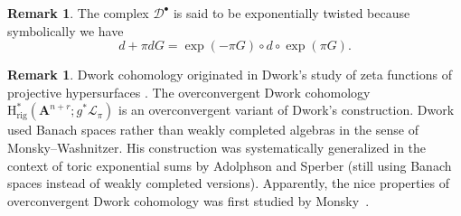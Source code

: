 \documentclass{amsart}
\numberwithin{equation}{section}
\theoremstyle{plain}
\theoremstyle{definition}
\newtheorem{remark}[equation]{Remark}
\renewcommand{\mathbb}{\mathbf}
\begin{document}
\begin{remark}%
The complex \(\mathcal{D}^{\bullet}\) is said to be exponentially
twisted because symbolically we have
\[
d + \pi dG = \exp(-\pi G) \circ d \circ \exp(\pi G).
\]
\end{remark}

\begin{remark}%
\label{remark:exponential-twist}
Dwork cohomology originated in Dwork's study of zeta functions of
projective hypersurfaces
\cite{dwork:zeta-function-hypersurface-1,dwork:zeta-function-hypersurface-2}.
The overconvergent Dwork cohomology
\(\mathrm{H}^{\ast}_{\mathrm{rig}}(\mathbb{A}^{n+r};g^{\ast}\mathcal{L}_{\pi})\)
is an overconvergent variant of Dwork's construction.  Dwork used
Banach spaces rather than weakly completed algebras in the sense of
Monsky--Washnitzer.  His construction was systematically generalized
in the context of toric exponential sums by Adolphson and Sperber
\cite{adolphson-sperber:exponential-sums-newton-polyhedra} (still
using Banach spaces instead of weakly completed versions).
Apparently, the nice properties of overconvergent Dwork cohomology was
first studied by Monsky~\cite{monsky:formal-cohomology-3}.
\end{remark}
\end{document}
